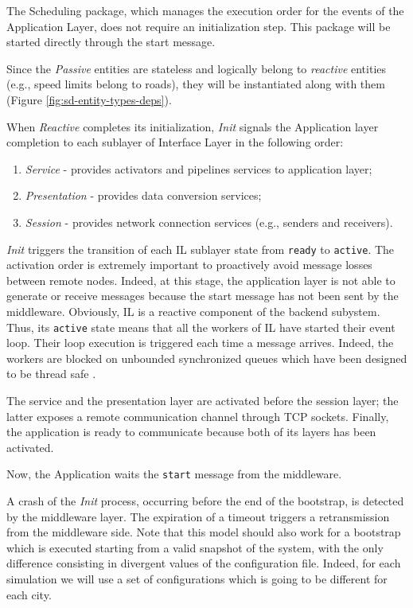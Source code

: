 The Scheduling package, which manages the execution order for the events of the
Application Layer, does not require an initialization step. This package
will be started directly through the start message.


Since the \textit{Passive} entities are stateless and
logically belong to \textit{reactive} entities (e.g., speed limits belong to
roads), they will be instantiated along with them
(Figure \ref{fig:sd-entity-types-deps}).

When \textit{Reactive} completes its initialization, \textit{Init}
signals the Application layer completion to each sublayer of Interface Layer
in the following order:

\begin{enumerate}
  \item \textit{Service} - provides activators and pipelines services to
    application layer;
  \item \textit{Presentation} - provides data conversion services;
  \item \textit{Session} - provides network connection services (e.g., senders
  and receivers).
\end{enumerate}

\textit{Init} triggers the transition of each IL sublayer state from
\verb|ready| to \verb|active|.
The activation order is extremely important to proactively avoid
message losses between remote nodes.
Indeed, at this stage, the application layer is
not able to generate or receive messages because the start message has not
been sent by the middleware. Obviously, IL is a reactive component
of the backend subystem. Thus, its \verb|active| state means
that all the workers of IL have started their event loop.
Their loop execution is triggered each time a
message arrives. Indeed, the workers are blocked on unbounded synchronized
queues which have been designed to be thread safe \cite{taft2006ada}.


The service and the presentation layer are activated before the session layer;
the latter exposes a remote communication channel through TCP
sockets.
Finally, the application is ready to communicate because both of its layers
has been activated.

Now, the Application waits the \verb|start|
message from the middleware.


A crash of the \textit{Init} process, occurring before the end of the
bootstrap, is detected by the middleware layer. The expiration
of a timeout triggers a retransmission from the middleware side.
Note that this model should also work for a bootstrap which is executed
starting
from a valid snapshot of the system, with the only difference consisting in
divergent values of the configuration file.
Indeed, for each simulation we will use a set
of configurations which is going to be different for each city.


